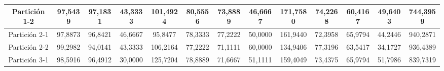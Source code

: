 \documentclass[12pt]{article}
\begin{document}
\begin{table}[H]
{\begin{tabular}{|c|cccc|cccc|cccc|}
Partición 1-2 & \multicolumn{1}{c|}{97,5439}                                                  & \multicolumn{1}{c|}{97,1831}                                                 & \multicolumn{1}{c|}{43,3333} & 101,4924 & \multicolumn{1}{c|}{80,5556}                                                  & \multicolumn{1}{c|}{73,8889}                                                 & \multicolumn{1}{c|}{46,6667} & 171,7580 & \multicolumn{1}{c|}{74,2268}                                                  & \multicolumn{1}{c|}{60,4167}                                                 & \multicolumn{1}{c|}{49,6403} & 744,3959  \\ \hline
Partición 2-1 & \multicolumn{1}{c|}{97,8873}                                                  & \multicolumn{1}{c|}{96,8421}                                                 & \multicolumn{1}{c|}{46,6667} & 95,8477  & \multicolumn{1}{c|}{78,3333}                                                  & \multicolumn{1}{c|}{77,2222}                                                 & \multicolumn{1}{c|}{50,0000} & 161,9440 & \multicolumn{1}{c|}{72,3958}                                                  & \multicolumn{1}{c|}{65,9794}                                                 & \multicolumn{1}{c|}{44,2446} & 940,2871  \\ \hline
Partición 2-2 & \multicolumn{1}{c|}{99,2982}                                                  & \multicolumn{1}{c|}{94,0141}                                                 & \multicolumn{1}{c|}{43,3333} & 106,2164 & \multicolumn{1}{c|}{77,2222}                                                  & \multicolumn{1}{c|}{71,1111}                                                 & \multicolumn{1}{c|}{60,0000} & 134,9406 & \multicolumn{1}{c|}{77,3196}                                                  & \multicolumn{1}{c|}{63,5417}                                                 & \multicolumn{1}{c|}{34,1727} & 936,4389  \\ \hline
Partición 3-1 & \multicolumn{1}{c|}{98,5916}                                                  & \multicolumn{1}{c|}{96,4912}                                                 & \multicolumn{1}{c|}{30,0000} & 125,7204 & \multicolumn{1}{c|}{78,8889}                                                  & \multicolumn{1}{c|}{71,6667}                                                 & \multicolumn{1}{c|}{51,1111} & 159,4049 & \multicolumn{1}{c|}{73,4375}                                                  & \multicolumn{1}{c|}{65,9794}                                                 & \multicolumn{1}{c|}{51,7986} & 839,7319  \\ \hline

\end{tabular}}
\end{table}
\end{document}
